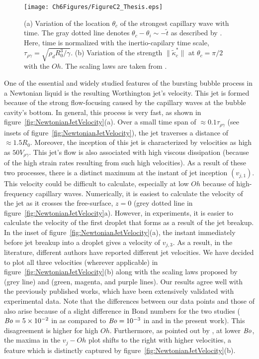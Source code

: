 \begin{subappendices}
\begin{figure}
	\centering
	\texttt{[image: Ch6Figures/FigureC2\_Thesis.eps]}
	\caption{(a) Variation of the location $\theta_c$ of the strongest capillary wave with time. The gray dotted line denotes $\theta_c - \theta_i \sim -\tilde t$ as described by \citep{gordillo2019capillary}. Here, time is normalized with the inertio-capilary time scale, $\tau_{\rho\gamma} = \sqrt{\rho_d R_0^3/\gamma}$. (b) Variation of the strength $\|\tilde \kappa_c^*\|$ at $\theta_c = \pi/2$ with the $Oh$. The scaling laws are taken from \citet{gordillo2019capillary}.}
	\label{fig:CapillaryWavesComparision}
\end{figure}

One of the essential and widely studied features of the bursting bubble process in a Newtonian liquid is the resulting Worthington jet's velocity. This jet is formed because of the strong flow-focusing caused by the capillary waves at the bubble cavity's bottom. In general, this process is very fast, as shown in figure~\ref{fig:NewtonianJetVelocity}(a). Over a small time span of $\approx 0.1\tau_{\rho\gamma}$ (see insets of figure~\ref{fig:NewtonianJetVelocity}), the jet traverses a distance of $\approx 1.5R_0$. Moreover, the inception of this jet is characterized by velocities as high as $50V_{\rho\gamma}$.  This jet's flow is also associated with high viscous dissipation (because of the high strain rates resulting from such high velocities). As a result of these two processes, there is a distinct maximum at the instant of jet inception  $\left(v_{j,1}\right)$. This velocity could be difficult to calculate, especially at low $Oh$ because of high-frequency capillary waves. Numerically, it is easiest to calculate the velocity of the jet as it crosses the free-surface, $z = 0$ (grey dotted line in figure~\ref{fig:NewtonianJetVelocity}a). However, in experiments, it is easier to calculate the velocity of the first droplet that forms as a result of the jet breakup. In the inset of figure~\ref{fig:NewtonianJetVelocity}(a), the instant immediately before jet breakup into a droplet gives a velocity of $v_{j,3}$. As a result, in the literature, different authors have reported different jet velocities. We have decided to plot all three velocities (wherever applicable) in figure~\ref{fig:NewtonianJetVelocity}(b) along with the scaling laws proposed by \citet{deike2018dynamics} (grey line) and \citet{gordillo2019capillary} (green, magenta, and purple lines). Our results agree well with the previously published works, which have been extensively validated with experimental data. Note that the differences between our data points and those of \citet{gordillo2019capillary} also arise because of a slight difference in Bond numbers for the two studies ($\mathit{Bo} = 5\times 10^{-2}$ in \citet{gordillo2019capillary} as compared to $\mathit{Bo} = 10^{-3}$ in \citet{deike2018dynamics} and in the present work). This disagreement is higher for high $Oh$. Furthermore, as pointed out by \citet{deike2018dynamics}, at lower $\mathit{Bo}$, the maxima in the $v_j - Oh$ plot shifts to the right with higher velocities, a feature which is distinctly captured by figure~\ref{fig:NewtonianJetVelocity}(b).


\end{subappendices}
